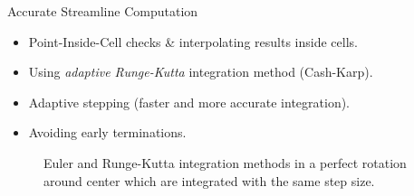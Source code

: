 \documentclass{beamer}
\begin{document}
\begin{frame}{Accurate Streamline Computation}
	\begin{itemize}
		\item Point-Inside-Cell checks \& interpolating results inside cells.
		\item Using \textit{adaptive Runge-Kutta} integration method (Cash-Karp).
		\item Adaptive stepping (faster and more accurate integration).
		\item Avoiding early terminations.
	\end{itemize}
    \begin{figure}
    	\centering
	    \caption{Euler and Runge-Kutta integration methods in a perfect rotation around center which are integrated with the same step size.}
    \end{figure}
\end{frame}
\end{document}
